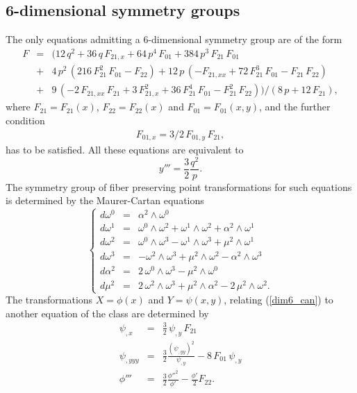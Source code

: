 \subsection{6-dimensional symmetry groups}
The only equations admitting a 6-dimensional symmetry group 
are of the form 
\begin{eqnarray*}
F&=&(12\,q^{2} + 36\,q\,F_{21,x} + 64\,p^{4}\,F_{01} 
+ 384\,p^{3}\,F_{21}\,F_{01} \nonumber \\
&+& 4\,p^{2}\,(216\,F_{21}^{2}\,F_{01} - F_{22}) 
+ 12\,p\,( - F_{21,xx} + 72\,F_{21}^{3}\,F_{01} - F_{21}\,F_{22}) 
\nonumber \\
&+& 9\,( - 2\,F_{21,xx}\,F_{21} + 3\,F_{21,x}^{2} + 36\,F_{21}^{4}\,F_{01} 
- F_{21}^{2}\,F_{22}))/(8\,p + 12\,F_{21}),
\end{eqnarray*}
where $F_{21}=F_{21}(x)$, $F_{22}=F_{22}(x)$ and $F_{01}=F_{01}(x,y)$, 
and the further condition
\begin{eqnarray*}
F_{01,x}=3/2\,F_{01,y}\,F_{21},
\end{eqnarray*}
%
has to be satisfied. All these equations are equivalent to 
\begin{equation}
\label{dim6_can}
y'''=\frac{3}{2}\frac{q^{2}}{p}.
\end{equation}
The symmetry group of fiber preserving point transformations for such 
equations is determined by the Maurer-Cartan equations 
%
\begin{equation}
\left\{
\begin{array}{lll}
d \omega^{0}&=&\alpha^{2} \wedge \omega^{0} \\
d \omega^{1}&=&\omega^{0} \wedge \omega^{2} + \omega^{1} \wedge \omega^{2} 
+ \alpha^{2} \wedge \omega^{1} \\
d \omega^{2}&=&\omega^{0} \wedge \omega^{3} - \omega^{1} \wedge \omega^{3} 
+ \mu^{2} \wedge \omega^{1} \\
d \omega^{3}&=& - \omega^{2} \wedge \omega^{3} + \mu^{2} \wedge \omega^{2} 
- \alpha^{2} \wedge \omega^{3} \\
d \alpha^{2}&=&2\,\omega^{0} \wedge \omega^{3} - \mu^{2} \wedge \omega^{0} \\
d \mu^{2}&=&2\,\omega^{2} \wedge \omega^{3} + \mu^{2} \wedge \alpha^{2} 
- 2\,\mu^{2} \wedge \omega^{2}.
\end{array} \right.
\end{equation}
The transformations $X=\phi(x)$ and $Y=\psi(x,y)$, relating (\ref{dim6_can}) 
to another equation of the class are determined by
\begin{eqnarray*}
\psi_{,x}&=&\frac{3}{2}\,\psi_{,y}\,F_{21} \\
\psi_{,yyy}&=&\frac{3}{2}\frac{(\psi_{,yy})^{2}}{\psi_{,y}}-8\,F_{01}\,
\psi_{,y} \\
\phi'''&=&\frac{3}{2}\frac{\phi''^{2}}{\phi'}-\frac{\phi'}{2}F_{22}.
\end{eqnarray*}

